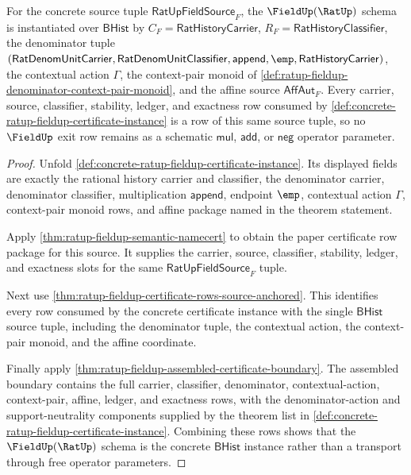 \begin{theorem}
\label{thm:ratup-fieldup-concrete-schema-instance}
For the concrete source tuple $\mathsf{RatUpFieldSource}_F$, the
$\FieldUp(\RatUp)$ schema is instantiated over $\mathsf{BHist}$ by
$C_F=\mathsf{RatHistoryCarrier}$, $R_F=\mathsf{RatHistoryClassifier}$, the
denominator tuple
$(\mathsf{RatDenomUnitCarrier},\mathsf{RatDenomUnitClassifier},
\mathsf{append},\emp,\mathsf{RatHistoryCarrier})$, the contextual action
$\Gamma$, the context-pair monoid of
\autoref{def:ratup-fieldup-denominator-context-pair-monoid}, and the affine
source $\mathsf{AffAut}_F$. Every carrier, source, classifier, stability,
ledger, and exactness row consumed by
\autoref{def:concrete-ratup-fieldup-certificate-instance} is a row of this same
source tuple, so no $\FieldUp$ exit row remains as a schematic
$\mathsf{mul}$, $\mathsf{add}$, or $\mathsf{neg}$ operator parameter.
\end{theorem}
\begin{proof}
Unfold \autoref{def:concrete-ratup-fieldup-certificate-instance}. Its displayed
fields are exactly the rational history carrier and classifier, the
denominator carrier, denominator classifier, multiplication $\mathsf{append}$,
endpoint $\emp$, contextual action $\Gamma$, context-pair monoid rows, and
affine package named in the theorem statement.

Apply \autoref{thm:ratup-fieldup-semantic-namecert} to obtain the paper
certificate row package for this source. It supplies the carrier, source,
classifier, stability, ledger, and exactness slots for the same
$\mathsf{RatUpFieldSource}_F$ tuple.

Next use \autoref{thm:ratup-fieldup-certificate-rows-source-anchored}. This
identifies every row consumed by the concrete certificate instance with the
single $\mathsf{BHist}$ source tuple, including the denominator tuple, the
contextual action, the context-pair monoid, and the affine coordinate.

Finally apply \autoref{thm:ratup-fieldup-assembled-certificate-boundary}. The
assembled boundary contains the full carrier, classifier, denominator,
contextual-action, context-pair, affine, ledger, and exactness rows, with the
denominator-action and support-neutrality components supplied by the theorem
list in \autoref{def:concrete-ratup-fieldup-certificate-instance}. Combining
these rows shows that the $\FieldUp(\RatUp)$ schema is the concrete
$\mathsf{BHist}$ instance rather than a transport through free operator
parameters.
\end{proof}

